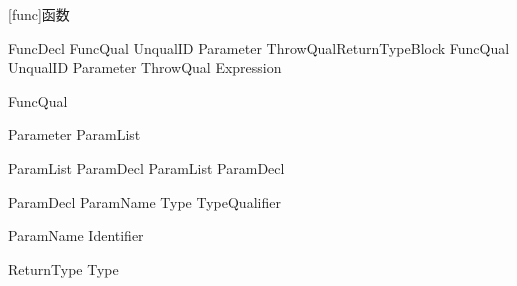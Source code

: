 
[func]{函数}

\begin{bnf}{FuncDecl}
    FuncQual\bnfs {} UnqualID Parameter ThrowQual\bnfq ReturnType\bnfq Block \br
    FuncQual\bnfs {} UnqualID Parameter ThrowQual\bnfq \terminal{=>} Expression \terminal{;}
\end{bnf}

\begin{bnf}{FuncQual}
     \br
     \br
\end{bnf}

\begin{bnf}{Parameter}
    \terminal{(} ParamList\bnfq \terminal{)}
\end{bnf}

\begin{bnf}{ParamList}
    ParamDecl \br
    ParamList \terminal{,} ParamDecl
\end{bnf}

\begin{bnf}{ParamDecl}
    ParamName \terminal{:} Type\bnfq \br
     \terminal{:} TypeQualifier\bnfp
\end{bnf}

\begin{bnf}{ParamName}
    Identifier \br
\end{bnf}

\begin{bnf}{ReturnType}
    \terminal{->} Type
\end{bnf}